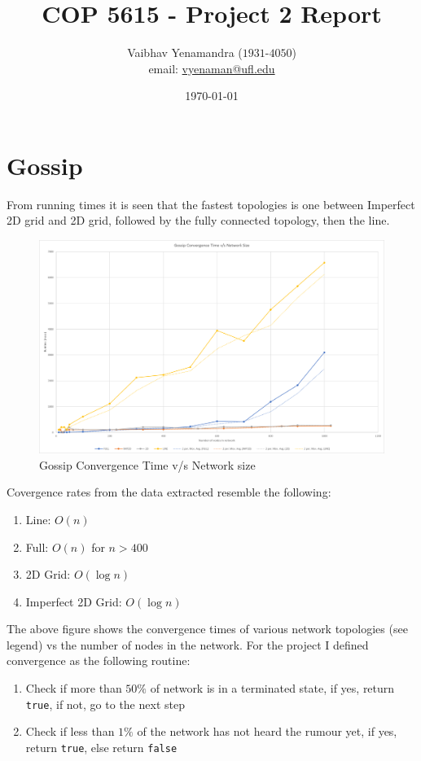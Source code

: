 \documentclass[a4paper, 10pt]{article}
\title{COP 5615 - Project 2 Report}
\author{Vaibhav Yenamandra ($1931$-$4050$)\\ email: \href{vyenaman@ufl.edu}{vyenaman@ufl.edu} }
\date{\today}
\begin{document}
    \maketitle

    \section{Gossip}
    From running times it is seen that the fastest topologies is one between Imperfect 2D grid and 2D grid, followed by the fully connected topology, then the line.
    \begin{figure}[h]
      \caption{Gossip Convergence Time v/s Network size}
      \includegraphics[width=\textwidth]{project2_gossip_chart}
    \end{figure}

    Covergence rates from the data extracted resemble the following:
    \begin{enumerate}
      \item{Line: $O(n)$}
      \item{Full: $O(n)$ for $n > 400$}
      \item{2D Grid: $O(\log n)$}
      \item{Imperfect 2D Grid: $O(\log n)$}
    \end{enumerate}

    The above figure shows the convergence times of various network topologies (see legend) vs the number of nodes in the network. For the project I defined convergence as the following routine:
    \begin{enumerate}
      \item{Check if more than $50\%$ of network is in a terminated state, if yes, return \texttt{true}, if not, go to the next step}
      \item{Check if less than $1\%$ of the network has not heard the rumour yet, if yes, return \texttt{true}, else return \texttt{false}}
    \end{enumerate}
\end{document}
